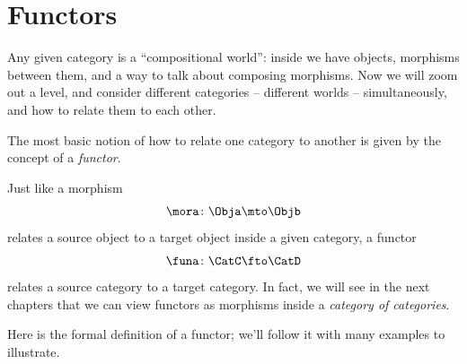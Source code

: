 
\section{Functors}
\label{sec:functors}
\label{sec:functors-intro}


Any given category \CatC is a ``compositional world'': inside \CatC we have objects, morphisms between them, and a way to talk about composing morphisms.
Now we will zoom out a level, and consider different categories -- different worlds -- simultaneously, and how to relate them to each other.

The most basic notion of how to relate one category to another is given by the concept of a \emph{functor}.

Just like a morphism
%
\begin{equation}
    \mora \colon \Obja \mto \Objb
\end{equation}
%
relates a source object to a target object inside a given category, a functor
%
\begin{equation}
    \funa \colon \CatC \fto \CatD
\end{equation}
%
relates a source category to a target category. In fact, we will see in the next chapters that we can view functors as morphisms inside a \emph{category of categories}.


Here is the formal definition of a functor; we'll follow it with many examples to illustrate. 



